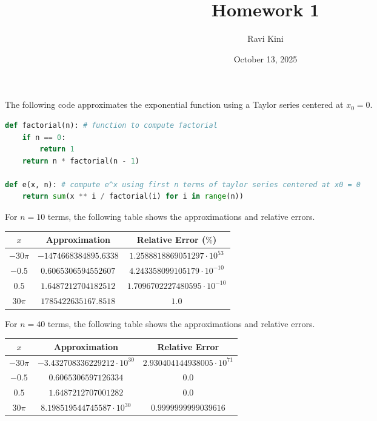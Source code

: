 \documentclass{article}
\title{Homework 1}
\author{Ravi Kini}
\date{October 13, 2025}
\begin{document}
\maketitle

\problem{}
The following code approximates the exponential function using a Taylor series centered at $x_0 = 0$.
\begin{lstlisting}[language=Python]
def factorial(n): # function to compute factorial
    if n == 0:
        return 1
    return n * factorial(n - 1)

def e(x, n): # compute e^x using first n terms of taylor series centered at x0 = 0
    return sum(x ** i / factorial(i) for i in range(n))
\end{lstlisting}
For $n = 10$ terms, the following table shows the approximations and relative errors.
\begin{center}
    \begin{tabular}{|c|c|c|}
        \hline
        $x$ & Approximation & Relative Error ($\%$) \\
        \hline
        $-30\pi$ & $-1474668384895.6338$ & $1.2588818869051297 \cdot 10^{53}$ \\
        \hline
        $-0.5$ & $0.6065306594552607$ & $4.243358099105179 \cdot 10^{-10}$ \\
        \hline
        $0.5$ & $1.6487212704182512$ & $1.7096702227480595 \cdot 10^{-10}$ \\
        \hline
        $30\pi$ & $1785422635167.8518$ & $1.0$ \\
        \hline
    \end{tabular}
\end{center}
For $n = 40$ terms, the following table shows the approximations and relative errors.
\begin{center}
    \begin{tabular}{|c|c|c|}
        \hline
        $x$ & Approximation & Relative Error \\
        \hline
        $-30\pi$ & $-3.432708336229212 \cdot 10^{30}$ & $2.930404144938005 \cdot 10^{71}$ \\
        \hline
        $-0.5$ & $0.6065306597126334$ & $0.0$ \\
        \hline
        $0.5$ & $1.6487212707001282$ & $0.0$ \\
        \hline
        $30\pi$ & $8.198519544745587 \cdot 10^{30}$ & $0.9999999999039616$ \\
        \hline
    \end{tabular}
\end{center}
\end{document}
